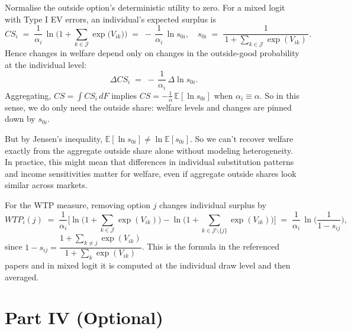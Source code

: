 \documentclass{article}
\begin{document}
Normalise the outside option’s deterministic utility to zero. For a mixed logit with Type I EV errors, an individual’s expected surplus is
\[
CS_i \;=\; \frac{1}{\alpha_i}\,\ln\!\Big(1+\sum_{k\in\mathcal{J}}\exp\big(V_{ik}\big)\Big)
\;=\; -\,\frac{1}{\alpha_i}\,\ln s_{0i},
\quad
s_{0i}\;=\;\frac{1}{\,1+\sum_{k\in\mathcal{J}}\exp(V_{ik})\,}.
\]
Hence changes in welfare depend only on changes in the outside-good probability at the individual level:
\[
\Delta CS_i \;=\; -\,\frac{1}{\alpha_i}\,\Delta\ln s_{0i}.
\]
Aggregating, \(CS=\int CS_i\,dF\) implies \(CS = -\tfrac{1}{\alpha}\,\mathbb{E}[\ln s_{0i}]\) when \(\alpha_i\equiv\alpha\). So in this sense, we do only need the outside share: welfare levels and changes are pinned down by \(s_{0i}\). 

\vspace{5mm}

But by Jensen's inequality, \(\mathbb{E}[\ln s_{0i}]\neq \ln\mathbb{E}[s_{0i}]\). So we can't recover welfare exactly from the aggregate outside share alone without modeling heterogeneity. In practice, this might mean that differences in individual substitution patterns and income sensitivities matter for welfare, even if aggregate outside shares look similar across markets.

\vspace{5mm}

For the WTP measure, removing option \(j\) changes individual surplus by
\[
WTP_i(j)
\;=\;
\frac{1}{\alpha_i}\Big[
\ln\!\Big(1+\textstyle\sum_{k\in\mathcal{J}}\exp(V_{ik})\Big)
-\ln\!\Big(1+\textstyle\sum_{k\in\mathcal{J}\setminus\{j\}}\exp(V_{ik})\Big)
\Big]
\;=\;
\frac{1}{\alpha_i}\,\ln\!\Big(\frac{1}{1-s_{ij}}\Big),
\]
since \(1-s_{ij}=\dfrac{1+\sum_{k\neq j}\exp(V_{ik})}{1+\sum_{k}\exp(V_{ik})}\). This is the formula in the referenced papers and in mixed logit it is computed at the individual draw level and then averaged.


\section*{Part IV (Optional)}
\end{document}
